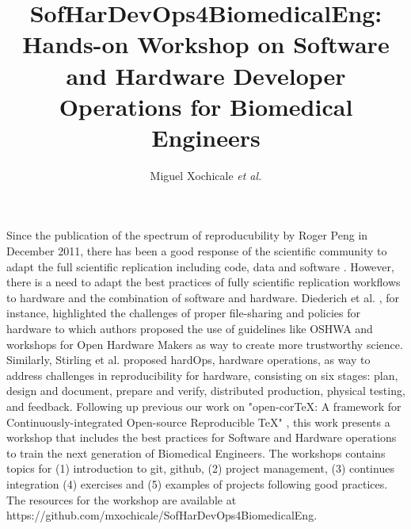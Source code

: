 \documentclass[11pt]{article}
\title{
SofHarDevOps4BiomedicalEng: Hands-on Workshop on Software and Hardware Developer Operations for Biomedical Engineers %
}
\author{Miguel Xochicale \textit{et al.}}
\date{\DTMNow}
\begin{document}
\maketitle

Since the publication of the spectrum of reproducubility by Roger Peng in December 2011, there has been a good response of the scientific community to adapt the full scientific replication including code, data and software \cite{peng2011}. 
However, there is a need to adapt the best practices of fully scientific replication workflows to hardware and the combination of software and hardware. 
Diederich et al. \cite{Diederich2022}, for instance, highlighted the challenges of proper file-sharing and policies for hardware to which authors proposed the use of guidelines like OSHWA and workshops for Open Hardware Makers as way to create more trustworthy science. 
Similarly, Stirling et al. \cite{stirling2022} proposed hardOps, hardware operations, as way to address challenges in reproducibility for hardware, consisting on six stages: plan, design and document, prepare and verify, distributed production, physical testing, and feedback. 
Following up previous our work on "open-corTeX: A framework for Continuously-integrated Open-source Reproducible TeX"
\cite{xochicale2020}, this work presents a workshop that includes the best practices for Software and Hardware operations to train the next generation of Biomedical Engineers.
The workshops contains topics for (1) introduction to git, github, (2) project management, (3) continues integration (4) exercises and (5) examples of projects following good practices.
The resources for the workshop are available at https://github.com/mxochicale/SofHarDevOps4BiomedicalEng.

\newpage
%



\end{document}
